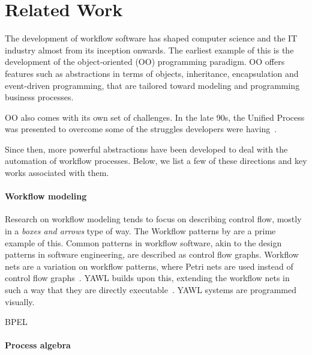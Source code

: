 
\section{Related Work}
\label{sec:relatedwork}

The development of workflow software has shaped computer science and the IT industry almost from its inception onwards.
The earliest example of this is the development of the object-oriented (OO) programming paradigm.
OO offers features such as abstractions in terms of objects, inheritance, encapsulation and event-driven programming, that are tailored toward modeling and programming business processes.

OO also comes with its own set of challenges.
In the late 90s, the Unified Process was presented to overcome some of the struggles developers were having~\cite{DBLP:books/daglib/0000196}.

Since then, more powerful abstractions have been developed to deal with the automation of workflow processes.
Below, we list a few of these directions and key works associated with them.

\paragraph{Workflow modeling}

Research on workflow modeling tends to focus on describing control flow, mostly in a \textit{boxes and arrows} type of way.
The Workflow patterns by \citet{journals/dpd/AalstHKB03} are a prime example of this. 
Common patterns in workflow software, akin to the design patterns in software engineering, are described as control flow graphs.
Workflow nets are a variation on workflow patterns, where Petri nets are used instead of control flow graphs~\cite{journals/infsof/LassenA09,journals/jcsc/Aalst98}.
YAWL builds upon this, extending the workflow nets in such a way that they are directly executable~\cite{journals/is/AalstH05}.
YAWL systems are programmed visually.

BPEL 

\paragraph{Process algebra}

